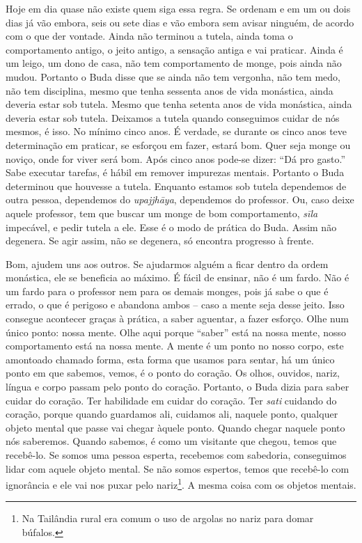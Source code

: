 Hoje em dia quase não existe quem siga essa regra. Se ordenam e em
um ou dois dias já vão embora, seis ou sete dias e vão embora sem
avisar ninguém, de acordo com o que der vontade. Ainda não terminou a
tutela, ainda toma o comportamento antigo, o jeito antigo, a sensação
antiga e vai praticar. Ainda é um leigo, um dono de casa, não tem
comportamento de monge, pois ainda não mudou. Portanto o Buda disse que
se ainda não tem vergonha, não tem medo, não tem disciplina, mesmo que
tenha sessenta anos de vida monástica, ainda deveria estar sob tutela.
Mesmo que tenha setenta anos de vida monástica, ainda deveria estar sob
tutela. Deixamos a tutela quando conseguimos cuidar de nós mesmos, é
isso. No mínimo cinco anos. É verdade, se durante os cinco anos teve
determinação em praticar, se esforçou em fazer, estará bom. Quer seja
monge ou noviço, onde for viver será bom. Após cinco anos pode-se
dizer: “Dá pro gasto.” Sabe executar tarefas, é hábil em remover
impurezas mentais. Portanto o Buda determinou que houvesse a tutela.
Enquanto estamos sob tutela dependemos de outra pessoa, dependemos do
\textit{upajjhāya}, dependemos do professor. Ou, caso deixe aquele
professor, tem que buscar um monge de bom comportamento,
\textit{sīla} impecável, e pedir tutela a ele. Esse é o modo de
prática do Buda. Assim não degenera. Se agir assim, não se degenera, só
encontra progresso à frente. 

Bom, ajudem uns aos outros. Se ajudarmos alguém a ficar dentro da
ordem monástica, ele se beneficia ao máximo. É fácil de ensinar, não é
um fardo. Não é um fardo para o professor nem para os demais monges,
pois já sabe o que é errado, o que é perigoso e abandona ambos – caso a
mente seja desse jeito. Isso consegue acontecer graças à prática, a
saber aguentar, a fazer esforço. Olhe num único ponto: nossa mente.
Olhe aqui porque “saber” está na nossa mente, nosso comportamento está
na nossa mente. A mente é um ponto no nosso corpo, este amontoado
chamado forma, esta forma que usamos para sentar, há um único ponto em
que sabemos, vemos, é o ponto do coração. Os olhos, ouvidos, nariz,
língua e corpo passam pelo ponto do coração. Portanto, o Buda dizia
para saber cuidar do coração. Ter habilidade em cuidar do coração. Ter
\textit{sati} cuidando do coração, porque quando guardamos ali,
cuidamos ali, naquele ponto, qualquer objeto mental que passe vai
chegar àquele ponto. Quando chegar naquele ponto nós saberemos. Quando
sabemos, é como um visitante que chegou, temos que recebê-lo. Se somos
uma pessoa esperta, recebemos com sabedoria, conseguimos lidar com
aquele objeto mental. Se não somos espertos, temos que recebê-lo com
ignorância e ele vai nos puxar pelo nariz\footnote{Na Tailândia rural
era comum o uso de argolas no nariz para domar búfalos.}. A mesma coisa
com os objetos mentais. 

